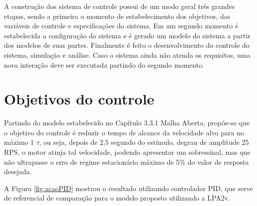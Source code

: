 

A construção dos sistema de controle possui de um modo geral três grandes etapas, sendo a primeira o momento de estabelecimento dos objetivos, das variáveis de controle e especificações do sistema. Em um segundo momento é estabelecida a configuração do sistema e é gerado um modelo do sistema a partir dos modelos de suas partes. Finalmente é feito o desenvolvimento do controle do sistema, simulação e análise. Caso o sistema ainda não atenda os requisitos, uma nova interação deve ser executada partindo do segundo momento.


\section{ Objetivos do controle }

Partindo do modelo estabelecido no Capítulo 3.3.1 Malha Aberta,  
propõe-se que o objetivo do controle é 
reduzir o tempo de alcance da velocidade alvo para no máximo 1 $\tau$, 
ou seja, depois de 2,5 segundo do estímulo, 
degrau de amplitude 25 RPS, 
o motor atinja tal velocidade, 
podendo apresentar um sobressinal, mas que não ultrapasse o   
erro de regime estacionário máximo de 5\% do valor de resposta desejada. 

A Figura \ref{fig:acaoPID} mostrou o resultado utilizando controlador PID, 
que serve de referencial de comparação para o modelo proposto utilizando 
a LPA2v. 










